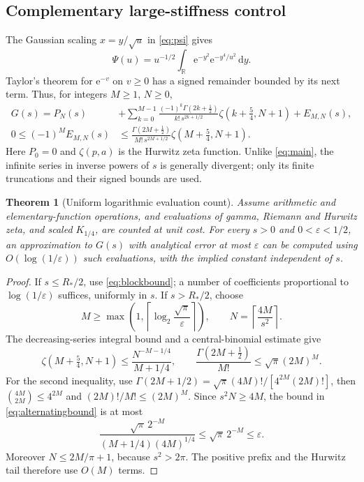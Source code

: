 \documentclass[11pt,a4paper]{article}
\numberwithin{equation}{section}
\newtheorem{theorem}{Theorem}[section]
\theoremstyle{definition}
\newcommand{\R}{\mathbb R}
\newcommand{\dd}{\,\mathrm d}
\newcommand{\e}{\mathrm e}
\begin{document}
\subsection{Complementary large-stiffness control}

The Gaussian scaling $x=y/\sqrt u$ in \eqref{eq:psi} gives
\[
 \Psi(u)=u^{-1/2}\int_{\R}\e^{-y^2}\e^{-y^4/u^2}\dd y.
\]
Taylor's theorem for $\e^{-v}$ on $v\ge0$ has a signed remainder
bounded by its next term. Thus, for integers $M\ge1$, $N\ge0$,
\begin{align}
 G(s)=P_N(s)&+\sum_{k=0}^{M-1}
 \frac{(-1)^k\Gamma(2k+\frac12)}{k!\,s^{2k+1/2}}
 \zeta(k+\tfrac54,N+1)+E_{M,N}(s),
 \label{eq:hurwitztail}\\
 0\le(-1)^M E_{M,N}(s)&\le
 \frac{\Gamma(2M+\frac12)}{M!\,s^{2M+1/2}}
 \zeta(M+\tfrac54,N+1).
 \label{eq:alternatingbound}
\end{align}
Here $P_0=0$ and $\zeta(p,a)$ is the Hurwitz zeta function.
Unlike \eqref{eq:main}, the infinite series in inverse powers of $s$
is generally divergent; only its finite truncations and their signed
bounds are used.

\begin{theorem}[Uniform logarithmic evaluation count]
\label{thm:complexity}
Assume arithmetic and elementary-function operations, and evaluations of
gamma, Riemann and Hurwitz zeta, and scaled $K_{1/4}$, are counted at
unit cost. For every $s>0$ and
$0<\varepsilon<1/2$, an approximation to $G(s)$ with analytical error
at most $\varepsilon$ can be computed using
$O(\log(1/\varepsilon))$ such evaluations, with the implied constant
independent of $s$.
\end{theorem}

\begin{proof}
If $s\le R_*/2$, use \eqref{eq:blockbound}; a number of coefficients
proportional to $\log(1/\varepsilon)$ suffices, uniformly in $s$.
If $s>R_*/2$, choose
\[
 M\ge\max\left(1,\left\lceil\log_2\frac{\sqrt\pi}{\varepsilon}
 \right\rceil\right),\qquad
 N=\left\lceil\frac{4M}{s^2}\right\rceil.
\]
The decreasing-series integral bound and a central-binomial estimate give
\[
 \zeta(M+\tfrac54,N+1)\le\frac{N^{-M-1/4}}{M+1/4},\qquad
 \frac{\Gamma(2M+\frac12)}{M!}\le\sqrt\pi(2M)^M.
\]
For the second inequality, use
$\Gamma(2M+1/2)=\sqrt\pi(4M)!/[4^{2M}(2M)!]$, then
$\binom{4M}{2M}\le4^{2M}$ and
$(2M)!/M!\le(2M)^M$. Since $s^2N\ge4M$, the bound in
\eqref{eq:alternatingbound} is at most
\[
 \frac{\sqrt\pi\,2^{-M}}{(M+1/4)(4M)^{1/4}}
 \le\sqrt\pi\,2^{-M}\le\varepsilon.
\]
Moreover $N\le2M/\pi+1$, because $s^2>2\pi$. The positive prefix
and the Hurwitz tail therefore use $O(M)$ terms.
\end{proof}
\end{document}
